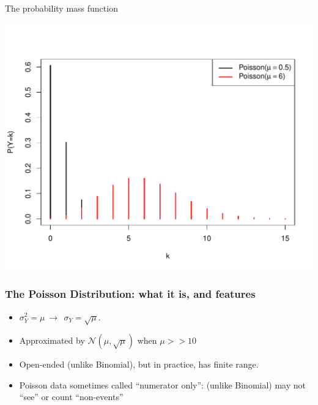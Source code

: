 \documentclass[10pt,handout]{beamer}\usepackage[]{graphicx}\usepackage[]{color}
\makeatletter
\def\maxwidth{ %
  \ifdim\Gin@nat@width>\linewidth
    \linewidth
  \else
    \Gin@nat@width
  \fi
}
\newenvironment{knitrout}{}{} %
\makeatother
\begin{document}
\begin{frame}[fragile]{The probability mass function}
	
\begin{knitrout}\tiny
{}\color{fgcolor}

{\centering \includegraphics[width=\maxwidth]{figure/unnamed-chunk-11-1} 

}



\end{knitrout}
	
\end{frame}


\begin{frame}
	\frametitle{The Poisson Distribution: what it is, and features}
	
	\begin{itemize}
		\setlength\itemsep{2em}
		\item  $\sigma^2_Y =  \mu \ \to \ \ \sigma_Y =  \sqrt{\mu}.$ \pause
		\item  Approximated by $\mathcal{N}(\mu, \sqrt{\mu})$ when $\mu >> 10$ \pause 
		\item Open-ended (unlike Binomial), but in practice, has finite range. 
		
		\item Poisson data sometimes called ``numerator only'':  (unlike Binomial) may not ``see'' or  count ``non-events''
	\end{itemize}
\end{frame}
\end{document}
